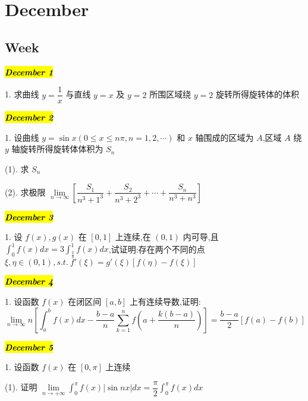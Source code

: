 \chapter{December}
\section{Week }
\hl{\textbf{\textit{December 1}}}

1. 求曲线 $y=\dfrac{1}{x}$ 与直线 $y=x$ 及 $y=2$ 所围区域绕 $y=2$ 旋转所得旋转体的体积
\begin{solution}
	
\end{solution}

\hl{\textbf{\textit{December 2}}}

1. 设曲线 $y=\sin x(0\leq x\leq n\pi,n=1,2,\cdots)$ 和 $x$ 轴围成的区域为 $A$,区域 $A$ 绕 $y$ 轴旋转所得旋转体体积为 $S_{n}$

(1). 求 $S_{n}$

(2). 求极限 $\lim\limits_{n\to\infty}[\dfrac{S_{1}}{n^{3}+1^{3}}+\dfrac{S_{2}}{n^{3}+2^{3}}+\cdots+\dfrac{S_{n}}{n^{3}+n^{3}}]$
\begin{solution}
	
\end{solution}

\hl{\textbf{\textit{December 3}}}

1. 设 $f(x),g(x)$ 在 $[0,1]$ 上连续,在 $(0,1)$ 内可导,且 $\int_{0}^{1}f(x)dx=3\int_{\frac{2}{3}}^{1}f(x)dx$,试证明:存在两个不同的点 $\xi,\eta\in(0,1),s.t.\ f'(\xi)=g'(\xi)[f(\eta)-f(\xi)]$
\begin{solution}
	
\end{solution}

\hl{\textbf{\textit{December 4}}}

1. 设函数 $f(x)$ 在闭区间 $[a,b]$ 上有连续导数,证明:
$$\lim\limits_{n\to\infty}n[\int_{a}^{b}f(x)dx-\dfrac{b-a}{n}\sum\limits_{k=1}^{n}f(a+\dfrac{k(b-a)}{n})]=\dfrac{b-a}{2}[f(a)-f(b)]$$
\begin{solution}
	
\end{solution}

\hl{\textbf{\textit{December 5}}}

1. 设函数 $f(x)$ 在 $[0,\pi]$ 上连续

(1). 证明 $\lim\limits_{n\to +\infty}\int_{0}^{\pi}f(x)|\sin nx|dx=\dfrac{\pi}{2}\int_{0}^{\pi}f(x)dx$

